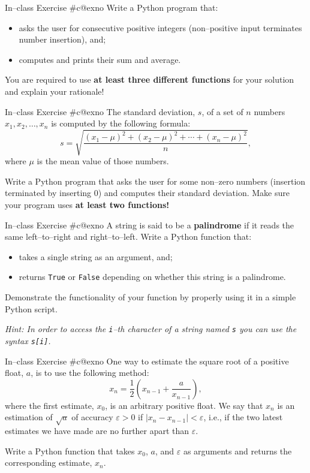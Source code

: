 \documentclass[aspectratio=169, 12pt, xcolor=table]{beamer}
\makeatletter
\newcommand{\arabicthree}[1]{\expandafter\@arabicthree\csname c@#1\endcsname}
\newcommand{\@arabicthree}[1]{\ifnum #1<100 0\fi\ifnum #1<10 0\fi\number#1}
\newcounter{exno}
\newcommand{\exno}{\stepcounter{exno}In--class Exercise \#\arabicthree{exno}}
\makeatother
\begin{document}
	\begin{frame}{\exno}
		Write a Python program that:
		\begin{itemize}
			\item asks the user for consecutive positive integers (non--positive input terminates number insertion), and;
			\item computes and prints their sum and average.
		\end{itemize}
		You are required to use \textbf{at least three different functions} for your solution and explain your rationale!
	\end{frame}

	\begin{frame}{\exno}
		The standard deviation, $s$, of a set of $n$ numbers $x_1,x_2,\ldots,x_n$ is computed by the following formula:
		\[s=\sqrt{\frac{(x_1-\mu)^2+(x_2-\mu)^2+\cdots+(x_n-\mu)^2}{n}},\]
		where $\mu$ is the mean value of those numbers.
		
		Write a Python program that asks the user for some non--zero numbers (insertion terminated by inserting 0) and computes their standard deviation. Make sure your program uses \textbf{at least two functions!}
	\end{frame}

	\begin{frame}{\exno}
		A string is said to be a \textbf{palindrome} if it reads the same left--to--right and right--to--left. Write a Python function that:
		\begin{itemize}
			\item takes a single string as an argument, and;
			\item returns \texttt{True} or \texttt{False} depending on whether this string is a palindrome.
		\end{itemize}
		Demonstrate the functionality of your function by properly using it in a simple Python script.
		
		\textit{Hint: In order to access the \texttt{i}--th character of a string named \texttt{s} you can use the syntax \texttt{s[i]}.}
	\end{frame}

	\begin{frame}{\exno}
		One way to estimate the square root of a positive float, $a$, is to use the following method:
		\[x_n=\frac{1}{2}\left(x_{n-1}+\frac{a}{x_{n-1}}\right),\]
		where the first estimate, $x_0$, is an arbitrary positive float. We say that $x_n$ is an estimation of $\sqrt{a}$ of accuracy $\varepsilon>0$ if $\left| x_n-x_{n-1}\right|<\varepsilon$, i.e., if the two latest estimates we have made are no further apart than $\varepsilon$.
		
		Write a Python function that takes $x_0$, $a$, and $\varepsilon$ as arguments and returns the corresponding estimate, $x_n$.
	\end{frame}
\end{document}
